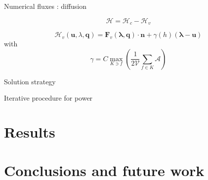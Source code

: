 \documentclass[24pt,t,table, aspectratio=169]{beamer}
\newcommand{\vecu}{\mathbf{u}}
\newcommand{\vecF}{\mathbf{F}}
\newcommand{\vecq}{\mathbf{q}}
\newcommand{\vecHcal}{\boldsymbol{\mathcal{H}}}
\newcommand{\veclambda}{\boldsymbol{\lambda}}
\begin{document}
\begin{frame}{Numerical fluxes : diffusion}

\begin{framed}
\begin{equation*}
\vecHcal = \vecHcal_c - \vecHcal_v
\end{equation*}
\end{framed}

\begin{equation*}
	\vecHcal_v(\vecu, \lambda, \vecq) = \vecF_v(\veclambda, \vecq) \cdot \mathbf{n} + \gamma(h) (\veclambda - \vecu)
\end{equation*}
with 
\begin{equation*}
	\gamma = C \max_{K \ni f}\left(\frac{1}{2\mathcal{V}} \sum_{f\in K} \mathcal{A}\right) 
\end{equation*}

\end{frame}

\begin{frame}{Solution strategy}



\end{frame}

\begin{frame}{Iterative procedure for power}

\end{frame}

\section{Results}

\section{Conclusions and future work}
\end{document}
